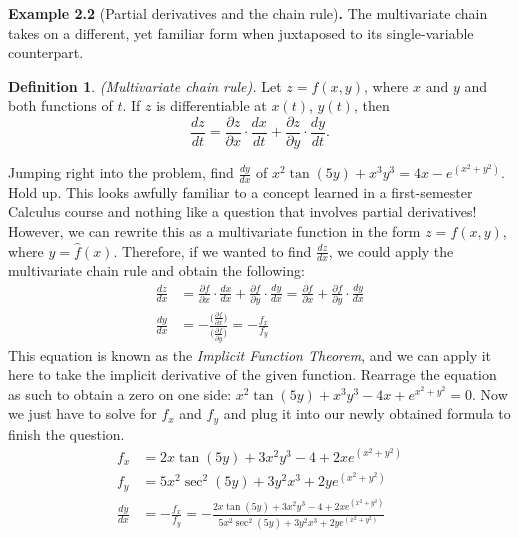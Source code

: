 \documentclass{article}
\theoremstyle{definition}
\newtheorem{definition}{Definition}
\begin{document}
\noindent\textbf{Example 2.2 }(Partial derivatives and the chain rule)\textbf{.}
The multivariate chain takes on a different, yet familiar form when juxtaposed to its 
single-variable counterpart.
\begin{definition}{\textit{(Multivariate chain rule).}}
Let $z = f(x,y)$, where $x$ and $y$ and both functions of $t$. If $z$ is %
differentiable at $x(t)$, $y(t)$, then
\begin{equation*}
    \frac{dz}{dt} = \frac{\partial z}{\partial x}\cdot \frac{dx}{dt} + %
    \frac{\partial z}{\partial y}\cdot \frac{dy}{dt}.
\end{equation*}
\end{definition}
\noindent Jumping right into the problem, find $\frac{dy}{dx}$ of $x^2\tan(5y) + x^3y^3 %
= 4x - e^{(x^2+y^2)}$. Hold up. This looks awfully familiar to a concept learned in
a first-semester Calculus course and nothing like a question that involves partial
derivatives! However, we can rewrite this as a multivariate function in the form
$z = f(x,y)$, where $y = \hat{f}(x)$. Therefore, if we wanted to find $\frac{dz}%
{dx}$, we could apply the multivariate chain rule and obtain the following:
\begin{equation*}
\begin{split}
    \frac{dz}{dx} &= \frac{\partial f}{\partial x}\cdot \frac{dx}{dx} + \frac{\partial f}%
    {\partial y}\cdot \frac{dy}{dx} = \frac{\partial f}{\partial x} + \frac{\partial f}%
    {\partial y}\cdot \frac{dy}{dx}\\
    \frac{dy}{dx} &= -\frac{\big(\frac{\partial f}{\partial x}\big)}%
    {\big(\frac{\partial f}{\partial y}\big)} = -\frac{f_x}{f_y}
\end{split}
\end{equation*}
This equation is known as the \textit{Implicit Function Theorem}, and we can apply it here
to take the implicit derivative of the given function. Rearrage the equation as such to
obtain a zero on one side: $x^2\tan(5y) + x^3y^3 - 4x + e^{x^2+y^2} = 0$. Now we just have
to solve for $f_x$ and $f_y$ and plug it into our newly obtained formula to finish the question.
\begin{equation*}
\begin{split}
    f_x &= 2x\tan(5y) + 3x^2y^3 - 4 + 2xe^{(x^2+y^2)}\\
    f_y &= 5x^2\sec^2(5y) + 3y^2x^3 + 2ye^{(x^2+y^2)}\\
    \frac{dy}{dx} &= -\frac{f_x}{f_y} = -\frac{2x\tan(5y) + 3x^2y^3 - 4 + 2xe^{(x^2+y^2)}}%
    {5x^2\sec^2(5y) + 3y^2x^3 + 2ye^{(x^2+y^2)}}
\end{split}
\end{equation*}
\end{document}
